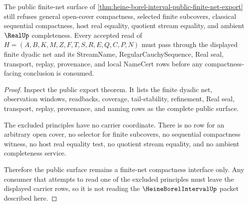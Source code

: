 \begin{theorem}
\label{thm:heine-borel-interval-cover-refusal-boundary}
The public finite-net surface of \autoref{thm:heine-borel-interval-public-finite-net-export} still refuses general open-cover compactness, selected finite subcovers, classical sequential compactness, host real equality, quotient stream equality, and ambient $\RealUp$ completeness. Every accepted read of $H=(A,B,K,M,Z,F,T,S,R,E,Q,C,P,N)$ must pass through the displayed finite dyadic net and its StreamName, RegularCauchySequence, Real seal, transport, replay, provenance, and local NameCert rows before any compactness-facing conclusion is consumed.
\end{theorem}
\begin{proof}
Inspect the public export theorem. It lists the finite dyadic net, observation windows, readbacks, coverage, tail-stability, refinement, Real seal, transport, replay, provenance, and naming rows as the complete public surface.

The excluded principles have no carrier coordinate. There is no row for an arbitrary open cover, no selector for finite subcovers, no sequential compactness witness, no host real equality test, no quotient stream equality, and no ambient completeness service.

Therefore the public surface remains a finite-net compactness interface only. Any consumer that attempts to read one of the excluded principles must leave the displayed carrier rows, so it is not reading the $\HeineBorelIntervalUp$ packet described here.
\end{proof}


